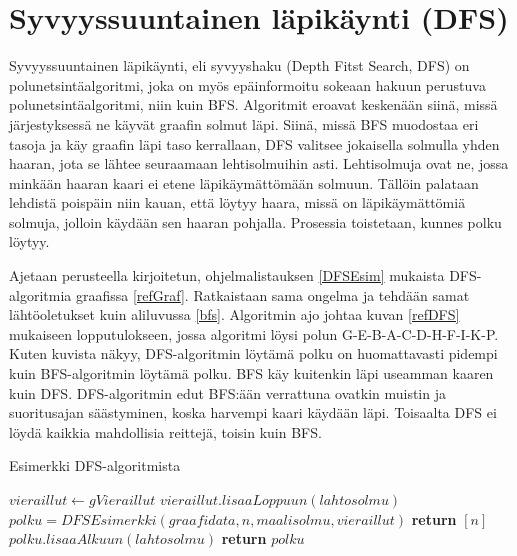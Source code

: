 \section{Syvyyssuuntainen läpikäynti (DFS)}\label{dfs}
Syvyyssuuntainen läpikäynti, eli syvyyshaku (Depth Fitst Search, DFS) on 
polunetsintäalgoritmi, joka on myös epäinformoitu sokeaan hakuun perustuva 
polunetsintäalgoritmi, niin kuin BFS.\cite{applSciLawande} Algoritmit eroavat 
keskenään siinä, missä järjestyksessä ne käyvät graafin solmut läpi. Siinä, 
missä BFS muodostaa eri tasoja ja käy graafin läpi taso kerrallaan, DFS 
valitsee jokaisella solmulla yhden haaran, jota se lähtee seuraamaan 
lehtisolmuihin asti.\cite{DFSMapColoring} Lehtisolmuja ovat ne, jossa minkään 
haaran kaari ei etene läpikäymättömään solmuun.\cite{DFSMapColoring} Tällöin 
palataan lehdistä poispäin niin kauan, että löytyy haara, missä on 
läpikäymättömiä solmuja, jolloin käydään sen haaran pohjalla. Prosessia 
toistetaan, kunnes polku löytyy. \par
	Ajetaan \textcite{DFSMapColoring} perusteella kirjoitetun, 
ohjelmalistauksen \ref{DFSEsim} mukaista DFS-algoritmia graafissa 
\ref{refGraf}. Ratkaistaan sama ongelma ja tehdään samat lähtöoletukset kuin 
aliluvussa \ref{bfs}. Algoritmin ajo johtaa kuvan \ref{refDFS} mukaiseen 
lopputulokseen, jossa algoritmi löysi polun G-E-B-A-C-D-H-F-I-K-P. 
Kuten kuvista näkyy, DFS-algoritmin löytämä polku on huomattavasti pidempi 
kuin BFS-algoritmin löytämä polku. BFS käy kuitenkin läpi useamman kaaren 
kuin DFS. DFS-algoritmin edut BFS:ään verrattuna ovatkin muistin ja 
suoritusajan säästyminen, koska harvempi kaari käydään 
läpi.\cite{applSciLawande} Toisaalta DFS ei löydä kaikkia mahdollisia reittejä, 
toisin kuin BFS.\cite{applSciLawande}

\begin{algorithm}
\caption{Esimerkki DFS-algoritmista}\label{DFSEsim}
\begin{algorithmic}
	\State $vieraillut \gets gVieraillut$
	\State $vieraillut.lisaaLoppuun(lahtosolmu)$
				\State $polku = DFSEsimerkki(graafidata,n,maalisolmu,vieraillut)$
			\Else
				\State \textbf{return} $[n]$
			\EndIf
		\EndIf
	\EndFor
		\State $polku.lisaaAlkuun(lahtosolmu)$
	\EndIf
	\State \textbf{return} $polku$
\EndProcedure
\end{algorithmic}
\end{algorithm}

